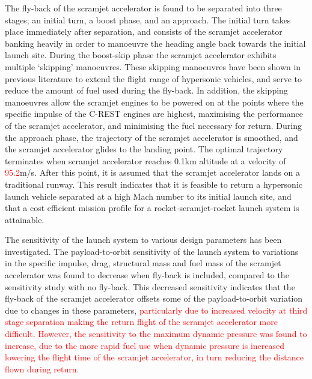 The fly-back of the scramjet accelerator is found to be separated into three stages; an initial turn, a boost phase, and an approach. 
The initial turn takes place immediately after separation, and consists of the scramjet accelerator banking heavily in order to manoeuvre the heading angle back towards the initial launch site. 
During the boost-skip phase the scramjet accelerator exhibits multiple `skipping' manoeuvres. These skipping manoeuvres have been shown in previous literature to extend the flight range of hypersonic vehicles\cite{Moshman2014,Darby2011,Toso2015,Tetlow1992,Eggers1957,Kanda2007,Chai2015}, and serve to reduce the amount of fuel used during the fly-back.
In addition, the skipping manoeuvres allow the scramjet engines to be powered on at the points where the specific impulse of the C-REST engines are highest, maximising the performance of the scramjet accelerator, and minimising the fuel necessary for return. 
During the approach phase, the trajectory of the scramjet accelerator is smoothed, and the scramjet accelerator glides to the landing point. 
 The optimal trajectory terminates when scramjet accelerator reaches 0.1km altitude at a velocity of \textcolor{red}{95.2}m/s. After this point, it is assumed that the scramjet accelerator lands on a traditional runway.  
This result indicates that it is feasible to return a hypersonic launch vehicle separated at a high Mach number to its initial launch site, and that a cost efficient mission profile for a rocket-scramjet-rocket launch system is attainable.  

The sensitivity of the launch system to various design parameters has been investigated. 
The payload-to-orbit sensitivity of the launch system to variations in the specific impulse, drag, structural mass and fuel mass of the scramjet accelerator was found to decrease when fly-back is included, compared to the sensitivity study with no fly-back. This decreased sensitivity indicates that the fly-back of the scramjet accelerator offsets some of the payload-to-orbit variation due to changes in these parameters, \textcolor{red}{particularly due to increased velocity at third stage separation making the return flight of the scramjet accelerator more difficult}. \textcolor{red}{However, the sensitivity to the maximum dynamic pressure was found to increase, due to the more rapid fuel use when dynamic pressure is increased lowering the flight time of the scramjet accelerator, in turn reducing the distance flown during return.}

